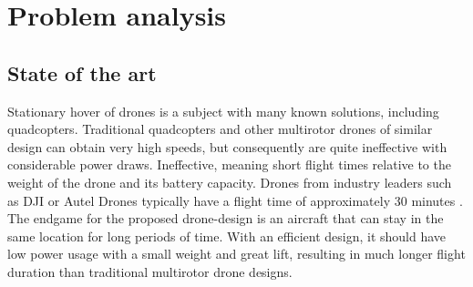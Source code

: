 \chapter{Problem analysis}
\section{State of the art} \label{sec:stateoftheart}
Stationary hover of drones is a subject with many known solutions, including quadcopters. Traditional quadcopters and other multirotor drones of similar design can obtain very high speeds, but consequently are quite ineffective with considerable power draws. Ineffective, meaning short flight times relative to the weight of the drone and its battery capacity. Drones from industry leaders such as DJI or Autel Drones typically have a flight time of approximately 30 minutes \cite{mavic2} \cite{MG-1} \cite{AutelEvo}.
The endgame for the proposed drone-design is an aircraft that can stay in the same location for long periods of time. With an efficient design, it should have low power usage with a small weight and great lift, resulting in much longer flight duration than traditional multirotor drone designs. 


